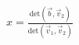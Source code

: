 \documentclass[preview]{standalone}
\begin{document}
\begin{align*}
x = \frac{\text{det}(\vec{b}, \vec{v}_2)}{\text{det}(\vec{v}_1, \vec{v}_2)}
\end{align*}
\end{document}
